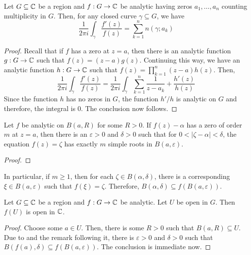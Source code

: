 \begin{theorem}
    Let $G\subseteq\mathbb{C}$ be a region and $f: G\to\mathbb{C}$ be analytic having zeros $a_1,\ldots,a_n$ counting multiplicity in $G$. Then, for any closed curve $\gamma\subseteq G$, we have
    \begin{equation*}
        \frac{1}{2\pi i}\int_\gamma\frac{f'(z)}{f(z)} = \sum_{k = 1}^n n(\gamma;a_k)
    \end{equation*}
\end{theorem}
\begin{proof}
    Recall that if $f$ has a zero at $z = a$, then there is an analytic function $g: G\to\mathbb{C}$ such that $f(z) = (z - a)g(z)$. Continuing this way, we have an analytic function $h: G\to\mathbb{C}$ such that $f(z) = \prod_{k = 1}^n (z - a) h(z)$. Then, 
    \begin{equation*}
        \frac{1}{2\pi i}\int_{\gamma}\frac{f'(z)}{f(z)} = \frac{1}{2\pi i}\int_{\gamma}\sum_{k = 1}^n\frac{1}{z - a_k} + \frac{h'(z)}{h(z)}
    \end{equation*}
    Since the function $h$ has no zeros in $G$, the function $h'/h$ is analytic on $G$ and therefore, the integral is $0$. The conclusion now follows.
\end{proof}

\begin{lemma}
    Let $f$ be analytic on $B(a,R)$ for some $R > 0$. If $f(z) - \alpha$ has a zero of order $m$ at $z = a$, then there is an $\varepsilon > 0$ and $\delta > 0$ such that for $0 < |\zeta - \alpha| < \delta$, the equation $f(z) = \zeta$ has exactly $m$ simple roots in $B(a,\varepsilon)$.
\end{lemma}
\begin{proof}
\end{proof}

In particular, if $m\ge 1$, then for each $\zeta\in B(\alpha,\delta)$, there is a corresponding $\xi\in B(a,\varepsilon)$ such that $f(\xi) = \zeta$. Therefore, $B(\alpha,\delta)\subseteq f(B(a,\varepsilon))$. 

\begin{theorem}
    Let $G\subseteq\mathbb{C}$ be a region and $f: G\to\mathbb{C}$ be analytic. Let $U$ be open in $G$. Then $f(U)$ is open in $\mathbb{C}$.
\end{theorem}
\begin{proof}
    Choose some $a\in U$. Then, there is some $R > 0$ such that $B(a,R)\subseteq U$. Due to  and the remark following it, there is $\varepsilon > 0$ and $\delta > 0$ such that $B(f(a),\delta)\subseteq f(B(a,\varepsilon))$. The conclusion is immediate now.
\end{proof}